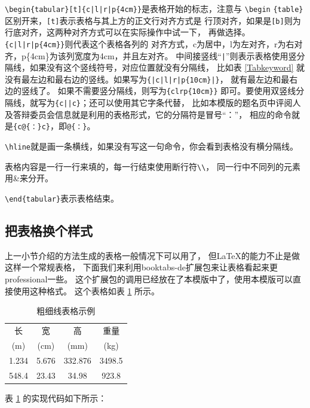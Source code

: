 \verb+\begin{tabular}[t]{c|l|r|p{4cm}}+是表格开始的标志，注意与
\verb+\begin+ \verb+{table}+区别开来，\verb+[t]+表示表格与其上方的正文行对齐方式是
行顶对齐，如果是\verb+[b]+则为行底对齐，这两种对齐方式可以在实际操作中试一下，
再做选择。\verb+{c|l|r|p{4cm}}+则代表这个表格各列的
对齐方式，c为居中，l为左对齐，r为右对齐，p\{4cm\}为该列宽度为4cm，并且左对齐。
中间接竖线“\verb+|+”则表示表格使用竖分隔线，如果没有这个竖线符号，对应位置就没有分隔线，
比如表 \ref{Tabkeyword} 就没有最左边和最右边的竖线。如果写为\verb+{|c|l|r|p{10cm}|}+，
就有最左边和最右边的竖线了。
如果不需要竖分隔线，则写为\verb+{clrp{10cm}}+
即可。要使用双竖线分隔线，就写为\verb+{c||c}+；还可以使用其它字条代替，
比如本模版的题名页中评阅人及答辩委员会信息就是利用的表格形式，它的分隔符是冒号“：”，
相应的命令就是\verb+{c@{：}c}+，即\verb+@{：}+。

\verb+\hline+就是画一条横线，如果没有写这一句命令，你会看到表格没有横分隔线。

表格内容是一行一行来填的，每一行结束使用断行符\verb+\\+，
同一行中不同列的元素用\&来分开。

\verb+\end{tabular}+表示表格结束。

\subsection{把表格换个样式}

上一小节介绍的方法生成的表格一般情况下可以用了，
但\LaTeX 的能力不止是做这样一个常规表格，
下面我们来利用booktabs-de扩展包来让表格看起来更professional一些。
这个扩展包的调用已经放在了本模版中了，使用本模版可以直接使用这种格式。
这个表格如表 \ref{Tab3Line} 所示。

{
\linespread{1}
\begin{table}[htb]
\caption{粗细线表格示例}
\label{Tab3Line}
\centering
\begin{tabular}[b]{cccc}
\toprule
长 & 宽 & 高 & 重量\\
(m) & (cm) & (mm) & (kg)\\
\toprule
1.234 & 5.676 & 332.876 & 3498.5\\
\midrule
548.4 & 23.43 & 34.98 & 923.8\\
\bottomrule
\end{tabular}
\end{table}
}

表 \ref{Tab3Line} 的实现代码如下所示：

